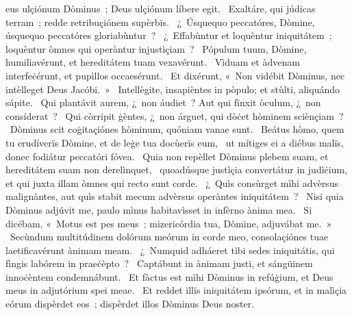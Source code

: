 \psalmChapterWithInscription{}
{ }
{%
eus ulçiónum Dòminus~; Deus ulçiónum líbere egit. 
~Exaltáre, qui júdicas terram~; redde retribuçiónem supèrbïs. 
~¿~Úsquequo peccatóres, Dòmine, úsquequo peccatóres gloriabùntur~? 
~¿~Effabùntur et loquèntur iniquitátem~; loquèntur òmnes qui operàntur injustìçiam~? 
~Pópulum tuum, Dòmine, humiliavérunt, et hereditátem tuam vexavérunt. 
~Vìduam et àdvenam interfeċérunt, et pupìllos occaesérunt. 
~Et dixérunt, «~Non vidébit Dòminus, nec intèlleget Deus Jacóbi.~»
~Intellègite, insapièntes in pòpulo; et stùlti, aliquándo sápite. 
~Qui plantávit aurem, ¿~non áudiet~? Aut qui fïnxit òculum, ¿~non consíderat~? 
~Qui còrripit ġèntes, ¿~non árguet, qui dòċet hòminem sciènçiam~? 
~Dòminus scit coġitaçiónes hòminum, quóniam vanae sunt. 
~Beátus hòmo, quem tu erudíverïs Dòmine, et de leġe tua docùerïs eum, 
~ut mítiges ei a diébus malïs, donec fodiátur peccatóri fóvea. 
~Quia non repèllet Dòminus plebem suam, et hereditátem suam non derelìnquet, 
~quoadúsque justìçia convertátur in judìċium, et qui juxta illam òmnes qui recto sunt corde. 
~¿~Quìs consùrget mìhi advèrsus malignàntes, aut quìs stabit mecum advèrsus operàntes iniquitátem~? 
~Nisi quia Dòminus adjúvit me, paulo mìnus habitavìsset in infèrno ànima mea. 
~Si dicébam, «~Motus est pes meus~; mizericórdia tua, Dòmine, adjuvábat me.~»
~Secùndum multitúdinem dolórum meórum in corde meo, consolaçiónes tuae laetificavérunt ànimam meam. 
~¿~Numquid adháeret tìbi sedes iniquitátis, qui fìngis labórem in praeċèpto~? 
~Captábunt in ànimam justi, et sángüinem innoċèntem condemnábunt. 
~Et fàctus est mìhi Dòminus in refúġium, et Deus meus in adjutórium spei meae. 
~Et reddet illïs iniquitátem ipsórum, et in malìçia eórum dispèrdet eos~; dispèrdet illos Dòminus Deus noster. 
}
